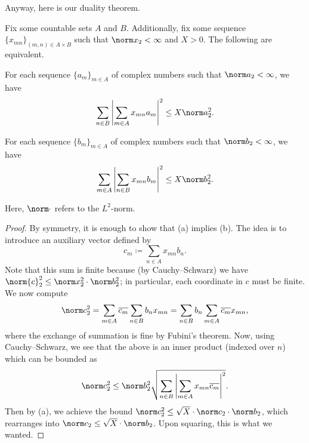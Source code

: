 \documentclass[../notes.tex]{subfiles}
\begin{document}
Anyway, here is our duality theorem.
\begin{theorem}
	Fix some countable sets $A$ and $B$. Additionally, fix some sequence $\{x_{mn}\}_{(m,n)\in A\times B}$ such that $\norm x_2<\infty$ and $X>0$. The following are equivalent.
	\begin{listalph}
		\item For each sequence $\{a_m\}_{m\in A}$ of complex numbers such that $\norm a_2<\infty$, we have
		\[\sum_{n\in B}\left|\sum_{m\in A}x_{mn}a_m\right|^2\le X\norm a_2^2.\]
		\item For each sequence $\{b_m\}_{m\in A}$ of complex numbers such that $\norm b_2<\infty$, we have
		\[\sum_{m\in A}\left|\sum_{n\in B}x_{mn}b_m\right|^2\le X\norm b_2^2.\]
	\end{listalph}
	Here, $\norm\cdot$ refers to the $L^2$-norm.
\end{theorem}
\begin{proof}
	By symmetry, it is enough to show that (a) implies (b). The idea is to introduce an auxiliary vector defined by
	\[c_m\coloneqq\sum_{n\in A}x_{mn}b_n.\]
	Note that this sum is finite because (by Cauchy--Schwarz) we have $\norm{c}_2^2\le\norm x_2^2\cdot\norm b_2^2$; in particular, each coordinate in $c$ must be finite. We now compute
	\[\norm c_2^2=\sum_{m\in A}\overline{c_m}\sum_{n\in B}b_nx_{mn}=\sum_{n\in B}b_n\sum_{m\in A}\overline{c_m}x_{mn},\]
	where the exchange of summation is fine by Fubini's theorem. Now, using Cauchy--Schwarz, we see that the above is an inner product (indexed over $n$) which can be bounded as
	\[\norm c_2^2\le\norm b_2^2\sqrt{\sum_{n\in B}\left|\sum_{m\in A}x_{mn}\overline{c_m}\right|^2}.\]
	Then by (a), we achieve the bound $\norm c_2^2\le\sqrt X\cdot\norm c_2\cdot\norm b_2$, which rearranges into $\norm c_2\le\sqrt X\cdot\norm b_2$. Upon squaring, this is what we wanted.
\end{proof}
\end{document}
